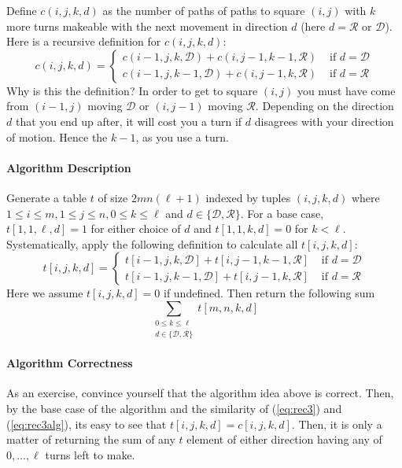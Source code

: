 \documentclass[11pt]{article}
\theoremstyle{plain}
\theoremstyle{definition}
\numberwithin{equation}{section}
\numberwithin{figure}{section}
\begin{document}
\noindent Define $c(i, j, k, d)$ as the number of paths of paths to square $(i,j)$  with $k$ more turns makeable with the next movement in direction $d$ (here $d = \mathcal{R}$ or $\mathcal{D}$). Here is a recursive definition for $c(i, j, k, d)$:
\begin{equation}
c(i,j,k, d) = \begin{cases} c(i-1, j, k, \mathcal{D}) + c(i, j-1, k - 1, \mathcal{R}) & \text{ if } d = \mathcal{D} \\
c(i-1, j, k-1, \mathcal{D}) + c(i, j-1,k, \mathcal{R}) & \text{ if } d = \mathcal{R}  \end{cases} \label{eq:rec3}
\end{equation}
Why is this the definition? In order to get to square $(i,j)$ you must have come from $(i - 1, j)$ moving $\mathcal{D}$ or $(i, j - 1)$ moving $\mathcal{R}$. Depending on the direction $d$ that you end up after, it will cost you a turn if $d$ disagrees with your direction of motion. Hence the $k-1$, as you use a turn.

\paragraph{Algorithm Description} Generate a table $t$ of size $2mn(\ell +1)$ indexed by tuples $(i, j, k, d)$ where $1 \leq i \leq m, 1 \leq j \leq n, 0 \leq k \leq \ell$ and $d \in \{ \mathcal{D}, \mathcal{R} \}$. For a base case, $t[1, 1, \ell, d] = 1$ for either choice of $d$ and $t[1,1,k, d] = 0$ for $k < \ell$. Systematically, apply the following definition to calculate all $t[i,j,k,d]$:
\begin{equation}
t[i,j,k,d] = \begin{cases} t[i-1, j, k, \mathcal{D}] + t[i, j-1, k - 1, \mathcal{R}] & \text{ if } d = \mathcal{D} \\
t[i-1, j, k-1, \mathcal{D}] + t[i, j-1,k, \mathcal{R}] & \text{ if } d = \mathcal{R}  \end{cases} \label{eq:rec3alg}
\end{equation}
Here we assume $t[i,j,k,d] = 0$ if undefined. Then return the following sum
\begin{equation}
\sum_{\substack{0 \leq k \leq \ell \\ d \in \{\mathcal{D},\mathcal{R}\}}} t[m,n,k,d]
\end{equation}

\paragraph{Algorithm Correctness} As an exercise, convince yourself that the algorithm idea above is correct. Then, by the base case of the algorithm and the similarity of (\ref{eq:rec3}) and (\ref{eq:rec3alg}), its easy to see that $t[i,j,k,d] = c[i,j,k,d]$. Then, it is only a matter of returning the sum of any $t$ element of either direction having any of $0, \ldots, \ell$ turns left to make.
\end{document}
